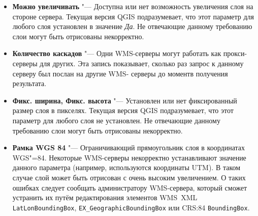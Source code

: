 \begin{itemize}[label=--]
\begin{itemize}[label=--]
\item \textbf{Можно увеличивать}    "--- Доступна или нет возможность
                                        увеличения слоя на стороне сервера.
                                        Текущая версия QGIS подразумевает, что
                                        этот параметр для любого слоя установлен
                                        в значение \textsl{Да}. Не отвечающие
                                        данному требованию слои могут быть
                                        отрисованы некорректно.

\item \textbf{Количество каскадов}  "--- Одни WMS-серверы могут работать как
                                        прокси-серверы для других. Эта запись
                                        показывает, сколько раз запрос к данному
                                        серверу был послан на другие WMS-
                                        серверы до моментв получения результата.

\item \textbf{Фикс. ширина, Фикс. высота}
                                   "--- Установлен или нет фиксированный
                                       размер слоя в пикселях. Текущая версия
                                       QGIS подразумевает, что этот параметр для
                                       любого слоя не установлен. Не отвечающие
                                       данному требованию слои могут быть
                                       отрисованы некорректно.

\item \textbf{Рамка WGS 84}        "--- Ограничивающий прямоугольник
                                       слоя в координатах WGS"=84. Некоторые
                                       WMS-серверы некорректно устанавливают значение данного параметра
                                       (например, используются координаты UTM).
                                       В таком случае слой может быть отрисован
                                       с очень высоким увеличением. О таких ошибках
                                       следует сообщать администратору WMS-сервера,
                                       который сможет устранить их
                                       путём редактирования элементов WMS~XML
                                       \texttt{LatLonBoundingBox},
                                       \texttt{EX\_GeographicBoundingBox} или
                                       CRS:84 \texttt{BoundingBox}.


\end{itemize}
\end{itemize}
